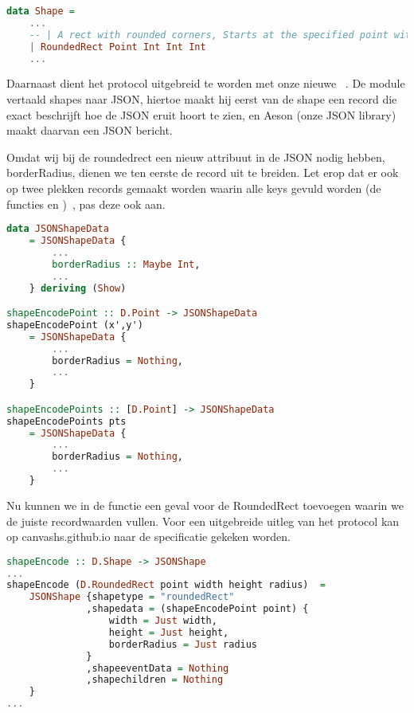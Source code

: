 \begin{lstlisting}[style=densecode, language=Haskell]
data Shape =
    ...
    -- | A rect with rounded corners, Starts at the specified point with a width (growing to the left), height (growing down), and a borderradius
    | RoundedRect Point Int Int Int
    ...
\end{lstlisting} 

Daarnaast dient het protocol uitgebreid te worden met onze nieuwe ~. De module  vertaald shapes naar JSON, hiertoe maakt hij eerst van de shape een record die exact beschrijft hoe de JSON eruit hoort te zien, en Aeson (onze JSON library) maakt daarvan een JSON bericht.

Omdat wij bij de roundedrect een nieuw attribuut in de JSON nodig hebben, borderRadius, dienen we ten eerste de  record uit te breiden. Let erop dat er ook op twee plekken records gemaakt worden waarin alle keys gevuld worden (de functies  en )~, pas deze ook aan.

\begin{lstlisting}[style=densecode, language=Haskell]
data JSONShapeData
    = JSONShapeData { 
        ...
        borderRadius :: Maybe Int,
        ...
    } deriving (Show)

shapeEncodePoint :: D.Point -> JSONShapeData
shapeEncodePoint (x',y')    
    = JSONShapeData { 
        ...
        borderRadius = Nothing,
        ...
    }

shapeEncodePoints :: [D.Point] -> JSONShapeData
shapeEncodePoints pts
    = JSONShapeData { 
        ...
        borderRadius = Nothing,
        ...
    }
\end{lstlisting}

Nu kunnen we in de functie  een geval voor de RoundedRect toevoegen waarin we de juiste recordwaarden vullen. Voor een uitgebreide uitleg van het protocol kan op canvashs.github.io naar de specificatie gekeken worden.

\begin{lstlisting}[style=densecode, language=Haskell]
shapeEncode :: D.Shape -> JSONShape
...
shapeEncode (D.RoundedRect point width height radius)  = 
    JSONShape {shapetype = "roundedRect" 
              ,shapedata = (shapeEncodePoint point) {
                  width = Just width, 
                  height = Just height, 
                  borderRadius = Just radius
              }
              ,shapeeventData = Nothing
              ,shapechildren = Nothing
    }
...
\end{lstlisting}
